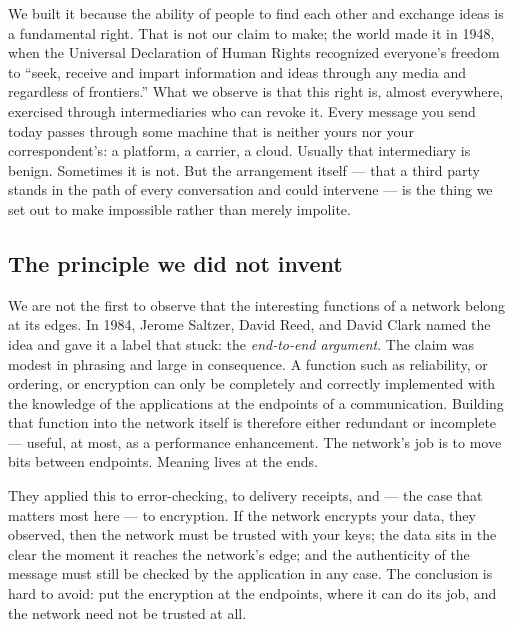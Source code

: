 \documentclass[nobib,justified]{tufte-handout}
\begin{document}
We built it because the ability of people to find each other and exchange
ideas is a fundamental right. That is not our claim to make; the world made it
in 1948, when the Universal Declaration of Human Rights recognized everyone's
freedom to ``seek, receive and impart information and ideas through any media
and regardless of frontiers.'' What we observe is that this right is, almost everywhere,
exercised through intermediaries who can revoke it. Every message
you send today passes through some machine that is neither yours nor your
correspondent's: a platform, a carrier, a cloud. Usually that intermediary is
benign. Sometimes it is not. But the arrangement itself --- that a third party
stands in the path of every conversation and could intervene --- is the thing
we set out to make impossible rather than merely impolite.

\subsection{The principle we did not invent}

We are not the first to observe that the interesting functions of a network
belong at its edges. In 1984, Jerome Saltzer, David Reed, and David Clark
named the idea and gave it a label that stuck: the \emph{end-to-end
argument}. The claim was modest in phrasing and large in consequence. A
function such as reliability, or ordering, or encryption can only be
completely and correctly implemented with the knowledge of the applications
at the endpoints of a communication. Building that function into the network
itself is therefore either redundant or incomplete --- useful, at most, as a
performance enhancement. The network's job is to move bits between endpoints.
Meaning lives at the ends.

They applied this to error-checking, to delivery receipts, and --- the case
that matters most here --- to encryption. If the network encrypts your data,
they observed, then the network must be trusted with your keys; the data sits
in the clear the moment it reaches the network's edge; and the authenticity of
the message must still be checked by the application in any case. The
conclusion is hard to avoid: put the encryption at the endpoints, where it can
do its job, and the network need not be trusted at all.
\end{document}
